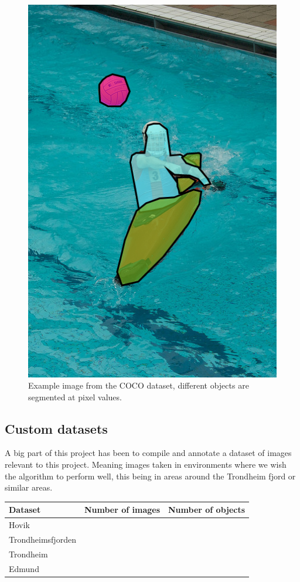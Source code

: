 \begin{figure}[h!]
    \centering
    \includegraphics[scale=0.5]{images/coco.png}
    \caption{Example image from the COCO dataset, different objects are segmented at pixel values.}
    \label{fig:coco}
\end{figure}

\subsection{Custom datasets}
A big part of this project has been to compile and annotate a dataset of images relevant to this project. Meaning images taken in environments where we wish the algorithm to perform well, this being in areas around the Trondheim fjord or similar areas.

\begin{table}[]
\begin{tabular}{|l|l|l|}
\hline
Dataset                  & Number of images &  Number of objects \\
\hline
Hovik                    &                  &                    \\
Trondheimsfjorden        &                  &                    \\ 
Trondheim                &                  &                    \\ 
Edmund                   &                  &                    \\
\hline        
\end{tabular}
\end{table}

